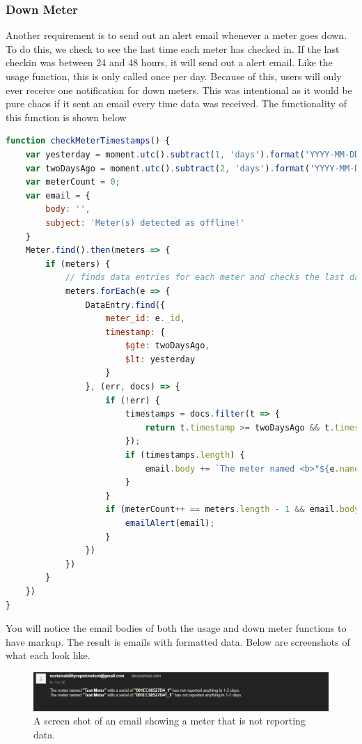 \documentclass[letterpaper,10pt,serif,draftclsnofoot,onecolumn,compsoc,titlepage]{IEEEtran}
\begin{document}
\subsubsection{Down Meter}
\noindent Another requirement is to send out an alert email whenever a meter goes down. To do this, we check to see the last time each meter has checked in. If the last checkin was between 24 and 48 hours, it will send out a alert email. Like the usage function, this is only called once per day. Because of this, users will only ever receive one notification for down meters. This was intentional as it would be pure chaos if it sent an email every time data was received. The functionality of this function is shown below
\begin{lstlisting}[language=Javascript]
function checkMeterTimestamps() {
    var yesterday = moment.utc().subtract(1, 'days').format('YYYY-MM-DD HH:mm:ss');
    var twoDaysAgo = moment.utc().subtract(2, 'days').format('YYYY-MM-DD HH:mm:ss');
    var meterCount = 0;
    var email = {
        body: '',
        subject: 'Meter(s) detected as offline!'
    }
    Meter.find().then(meters => {
        if (meters) {
            // finds data entries for each meter and checks the last data entries time.
            meters.forEach(e => {
                DataEntry.find({
                    meter_id: e._id,
                    timestamp: {
                        $gte: twoDaysAgo,
                        $lt: yesterday
                    }
                }, (err, docs) => {
                    if (!err) {
                        timestamps = docs.filter(t => {
                            return t.timestamp >= twoDaysAgo && t.timestamp <= yesterday
                        });
                        if (timestamps.length) {
                            email.body += `The meter named <b>"${e.name}"</b> with a serial of <b>"${e.meter_id}"</b> has not reported anything in 1-2 days. <br>`
                        }
                    }
                    if (meterCount++ == meters.length - 1 && email.body !== '') {
                        emailAlert(email);
                    }
                })
            })
        }
    })
}
\end{lstlisting}
You will notice the email bodies of both the usage and down meter functions to have markup. The result is emails with formatted data. Below are screenshots of what each look like.
\begin{figure}[H]
  \centering
  \includegraphics[width=17cm]{images/outage.eps}
  \caption{A screen shot of an email showing a meter that is not reporting data.}
\end{figure}
\end{document}
